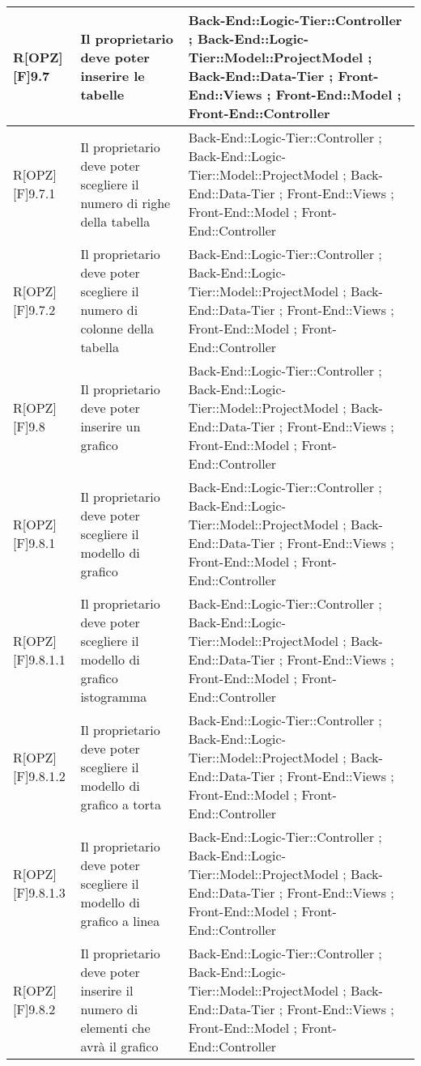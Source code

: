 \begin{table}[h]
\begin{tabular}{|p{}|p{}|p{}|}
			R[OPZ][F]9.7 & Il proprietario deve poter inserire le tabelle & Back-End::Logic-Tier::Controller ; Back-End::Logic-Tier::Model::ProjectModel ; Back-End::Data-Tier ; Front-End::Views ; Front-End::Model ; Front-End::Controller \\ \midrule
			R[OPZ][F]9.7.1 & Il proprietario deve poter scegliere il numero di righe della tabella & Back-End::Logic-Tier::Controller ; Back-End::Logic-Tier::Model::ProjectModel ; Back-End::Data-Tier ; Front-End::Views ; Front-End::Model ; Front-End::Controller \\ \midrule
			R[OPZ][F]9.7.2 & Il proprietario deve poter scegliere il numero di colonne della tabella & Back-End::Logic-Tier::Controller ; Back-End::Logic-Tier::Model::ProjectModel ; Back-End::Data-Tier ; Front-End::Views ; Front-End::Model ; Front-End::Controller \\ \midrule
			R[OPZ][F]9.8 & Il proprietario deve poter inserire un grafico & Back-End::Logic-Tier::Controller ; Back-End::Logic-Tier::Model::ProjectModel ; Back-End::Data-Tier ; Front-End::Views ; Front-End::Model ; Front-End::Controller \\ \midrule
			R[OPZ][F]9.8.1 & Il proprietario deve poter scegliere il modello di grafico & Back-End::Logic-Tier::Controller ; Back-End::Logic-Tier::Model::ProjectModel ; Back-End::Data-Tier ; Front-End::Views ; Front-End::Model ; Front-End::Controller \\ \midrule
			R[OPZ][F]9.8.1.1 & Il proprietario deve poter scegliere il modello di grafico istogramma & Back-End::Logic-Tier::Controller ; Back-End::Logic-Tier::Model::ProjectModel ; Back-End::Data-Tier ; Front-End::Views ; Front-End::Model ; Front-End::Controller \\ \midrule
			R[OPZ][F]9.8.1.2 & Il proprietario deve poter scegliere il modello di grafico a torta & Back-End::Logic-Tier::Controller ; Back-End::Logic-Tier::Model::ProjectModel ; Back-End::Data-Tier ; Front-End::Views ; Front-End::Model ; Front-End::Controller \\ \midrule
			R[OPZ][F]9.8.1.3 & Il proprietario deve poter scegliere il modello di grafico a linea & Back-End::Logic-Tier::Controller ; Back-End::Logic-Tier::Model::ProjectModel ; Back-End::Data-Tier ; Front-End::Views ; Front-End::Model ; Front-End::Controller \\ \midrule
			R[OPZ][F]9.8.2 & Il proprietario deve poter inserire il numero di elementi che avrà il grafico & Back-End::Logic-Tier::Controller ; Back-End::Logic-Tier::Model::ProjectModel ; Back-End::Data-Tier ; Front-End::Views ; Front-End::Model ; Front-End::Controller \\ \midrule

\end{tabular}
\end{table}
